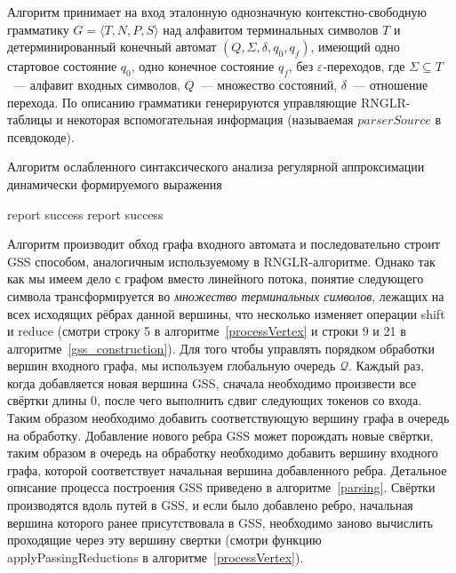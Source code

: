 Алгоритм принимает на вход эталонную однозначную контекстно-свободную грамматику $G=\langle T, N, P, S \rangle$ над алфавитом терминальных символов $T$ и детерминированный конечный автомат $(Q,\Sigma,\delta,q_0,q_f)$, имеющий одно стартовое состояние $q_0$, одно конечное состояние $q_f$, без $\varepsilon$-переходов, где $\Sigma \subseteq T$~--- алфавит входных символов, $Q$~--- множество состояний, $\delta$~--- отношение перехода. По описанию  грамматики генерируются управляющие RNGLR-таблицы и некоторая вспомогательная информация (называемая $parserSource$ в псевдокоде). 

\begin{algorithm}[!ht]
\begin{algorithmic}[1]
\caption{Алгоритм ослабленного синтаксического анализа регулярной аппроксимации динамически формируемого выражения}
\label{parsing}
     {report success}
    \EndIf
  \Else
    \EndWhile
     {report success}
    \EndIf
  \EndIf
\EndFunction
\end{algorithmic}
\end{algorithm}

Алгоритм производит обход графа входного автомата и последовательно строит GSS способом, аналогичным используемому в RNGLR-алгоритме. Однако так как мы имеем дело с графом вместо линейного потока, понятие следующего символа трансформируется во \emph{множество терминальных символов}, лежащих на всех исходящих рёбрах данной вершины, что несколько изменяет операции shift и reduce (смотри строку 5 в алгоритме~\ref{processVertex} и строки 9 и 21 в алгоритме~\ref{gss_construction}). Для того чтобы управлять порядком обработки вершин входного графа, мы используем глобальную очередь $\mathcal{Q}$. Каждый раз, когда добавляется новая вершина GSS, сначала необходимо произвести все свёртки длины 0, после чего выполнить сдвиг следующих токенов со входа. Таким образом необходимо добавить соответствующую вершину графа в очередь на обработку. Добавление нового ребра GSS может порождать новые свёртки, таким образом в очередь на обработку необходимо добавить вершину входного графа, которой соответствует начальная вершина добавленного ребра. Детальное описание процесса построения GSS приведено в алгоритме~\ref{parsing}. Свёртки производятся вдоль путей в GSS, и если было добавлено ребро, начальная вершина которого ранее присутствовала в GSS, необходимо заново вычислить проходящие через эту вершину свертки (смотри функцию applyPassingReductions в алгоритме~\ref{processVertex}).

